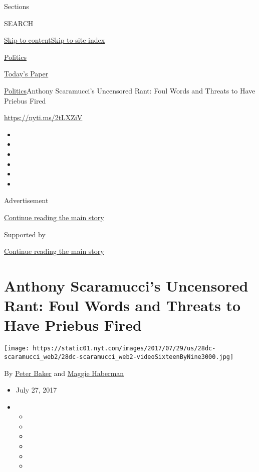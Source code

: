 Sections

SEARCH

\protect\hyperlink{site-content}{Skip to
content}\protect\hyperlink{site-index}{Skip to site index}

\href{https://www.nytimes.com/section/politics}{Politics}

\href{https://myaccount.nytimes.com/auth/login?response_type=cookie\&client_id=vi}{}

\href{https://www.nytimes.com/section/todayspaper}{Today's Paper}

\href{/section/politics}{Politics}\textbar{}Anthony Scaramucci's
Uncensored Rant: Foul Words and Threats to Have Priebus Fired

\url{https://nyti.ms/2tLXZiV}

\begin{itemize}
\item
\item
\item
\item
\item
\item
\end{itemize}

Advertisement

\protect\hyperlink{after-top}{Continue reading the main story}

Supported by

\protect\hyperlink{after-sponsor}{Continue reading the main story}

\hypertarget{anthony-scaramuccis-uncensored-rant-foul-words-and-threats-to-have-priebus-fired}{%
\section{Anthony Scaramucci's Uncensored Rant: Foul Words and Threats to
Have Priebus
Fired}\label{anthony-scaramuccis-uncensored-rant-foul-words-and-threats-to-have-priebus-fired}}

\texttt{[image: https://static01.nyt.com/images/2017/07/29/us/28dc-scaramucci\_web2/28dc-scaramucci\_web2-videoSixteenByNine3000.jpg]}

By \href{http://www.nytimes.com/by/peter-baker}{Peter Baker} and
\href{http://www.nytimes.com/by/maggie-haberman}{Maggie Haberman}

\begin{itemize}
\item
  July 27, 2017
\item
  \begin{itemize}
  \item
  \item
  \item
  \item
  \item
  \item
  \end{itemize}
\end{itemize}

